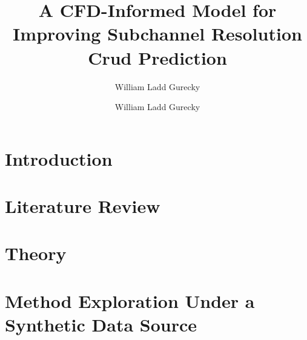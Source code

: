 \documentclass[12pt]{report}
\author{William Ladd Gurecky}  	%
\title{ A CFD-Informed Model for Improving Subchannel Resolution Crud Prediction}
\author{William Ladd Gurecky}
\begin{document}
\copyrightpage          %
\commcertpage           %

\titlepage              %
	
\renewcommand{\thepage}{\roman{page}}






\pagebreak
\tableofcontents
\pagebreak



\renewcommand{\thepage}{\arabic{page}} %
\setcounter{page}{1}
\onehalfspacing
\chapter{Introduction}
\label{chap:intro}


\chapter{Literature Review}
\label{chap:lit}


\chapter{Theory}
\label{chap:theory}


\chapter{Method Exploration Under a Synthetic Data Source}
\label{chap:work}


\end{document}
